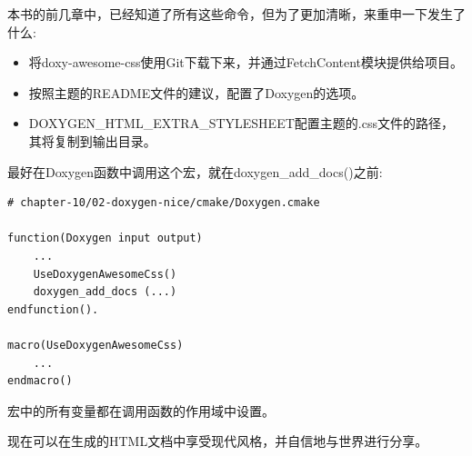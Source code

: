 本书的前几章中，已经知道了所有这些命令，但为了更加清晰，来重申一下发生了什么:

\begin{itemize}
\item 
将doxy-awesome-css使用Git下载下来，并通过FetchContent模块提供给项目。

\item 
按照主题的README文件的建议，配置了Doxygen的选项。

\item 
DOXYGEN\_HTML\_EXTRA\_STYLESHEET配置主题的.css文件的路径，其将复制到输出目录。
\end{itemize}

最好在Doxygen函数中调用这个宏，就在doxygen\_add\_docs()之前:

\begin{lstlisting}[style=styleCMake]
# chapter-10/02-doxygen-nice/cmake/Doxygen.cmake

function(Doxygen input output)
	...
	UseDoxygenAwesomeCss()
	doxygen_add_docs (...)
endfunction().

macro(UseDoxygenAwesomeCss)
	...
endmacro()
\end{lstlisting}

宏中的所有变量都在调用函数的作用域中设置。

现在可以在生成的HTML文档中享受现代风格，并自信地与世界进行分享。
















